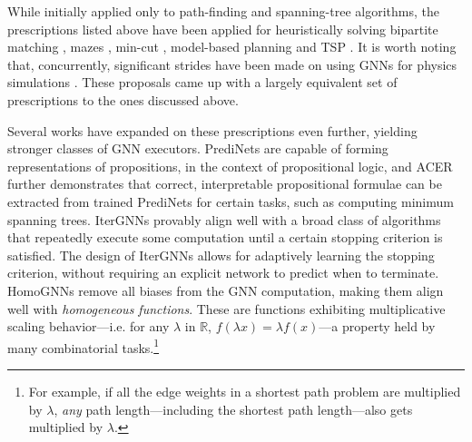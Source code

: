 \documentclass[twoside,11pt]{article}
\begin{document}
While initially applied only to path-finding and spanning-tree algorithms, the prescriptions listed above have been applied for heuristically solving bipartite matching \citep{Georgiev2020}, mazes \citep{schwarzschild2021can,bansal2022end}, min-cut \citep{awasthi2021beyond}, model-based planning \citep{deac2020graph,Deac2020} and TSP \citep{Joshi2020}. It is worth noting that, concurrently, significant strides have been made on using GNNs for physics simulations \citep{Sanchez-Gonzalez2020,pfaff2020learning}. These proposals came up with a largely equivalent set of prescriptions to the ones discussed above. %

Several works have expanded on these prescriptions even further, yielding stronger classes of GNN executors. PrediNets \citep{shanahan2020explicitly} are capable of forming representations of propositions, in the context of propositional logic, and ACER \citep{georgiev2022algorithmic} further demonstrates that correct, interpretable propositional formulae can be extracted from trained PrediNets for certain tasks, such as computing minimum spanning trees. IterGNNs \citep{tang2020towards} provably align well with a broad class of algorithms that repeatedly execute some computation until a certain stopping criterion is satisfied. The design of IterGNNs allows for adaptively learning the stopping criterion, without requiring an explicit network to predict when to terminate. HomoGNNs \citep{tang2020towards} remove all biases from the GNN computation, making them align well with \emph{homogeneous functions}. These are functions exhibiting multiplicative scaling behavior---i.e. for any $\lambda$ in $\mathbb{R}$, $f(\lambda x) = \lambda f(x)$---a property held by many combinatorial tasks.\footnote{For example, if all the edge weights in a shortest path problem are multiplied by $\lambda$, \emph{any} path length---including the shortest path length---also gets multiplied by $\lambda$.} 
\end{document}

